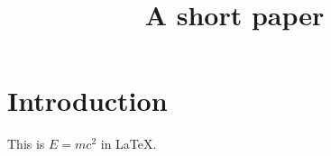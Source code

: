 \documentclass{article}
\title{A short paper}
\begin{document}
\maketitle
\section{Introduction}
This is $E = mc^2$ in \LaTeX.
\end{document}
